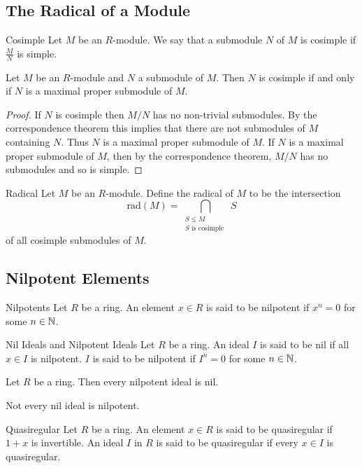 \documentclass[a4paper]{article}
\begin{document}
\subsection{The Radical of a Module}
\begin{defn}{Cosimple}{} Let $M$ be an $R$-module. We say that a submodule $N$ of $M$ is cosimple if $\frac{M}{N}$ is simple. 
\end{defn}

\begin{lmm}{}{} Let $M$ be an $R$-module and $N$ a submodule of $M$. Then $N$ is cosimple if and only if $N$ is a maximal proper submodule of $M$. \tcbline
\begin{proof}
If $N$ is cosimple then $M/N$ has no non-trivial submodules. By the correspondence theorem this implies that there are not submodules of $M$ containing $N$. Thus $N$ is a maximal proper submodule of $M$. If $N$ is a maximal proper submodule of $M$, then by the correspondence theorem, $M/N$ has no submodules and so is simple. 
\end{proof}
\end{lmm}

\begin{defn}{Radical}{} Let $M$ be an $R$-module. Define the radical of $M$ to be the intersection $$\text{rad}(M)=\bigcap_{\substack{S\leq M\\S\text{ is cosimple }}}S$$ of all cosimple submodules of $M$. 
\end{defn}

\subsection{Nilpotent Elements}
\begin{defn}{Nilpotents}{} Let $R$ be a ring. An element $x\in R$ is said to be nilpotent if $x^n=0$ for some $n\in\mathbb{N}$. 
\end{defn}

\begin{defn}{Nil Ideals and Nilpotent Ideals}{} Let $R$ be a ring. An ideal $I$ is said to be nil if all $x\in I$ is nilpotent. $I$ is said to be nilpotent if $I^n=0$ for some $n\in\mathbb{N}$. 
\end{defn}

\begin{lmm}{}{} Let $R$ be a ring. Then every nilpotent ideal is nil. 
\end{lmm}

Not every nil ideal is nilpotent. 

\begin{defn}{Quasiregular}{} Let $R$ be a ring. An element $x\in R$ is said to be quasiregular if $1+x$ is invertible. An ideal $I$ in $R$ is said to be quasiregular if every $x\in I$ is quasiregular. 
\end{defn}
\end{document}
